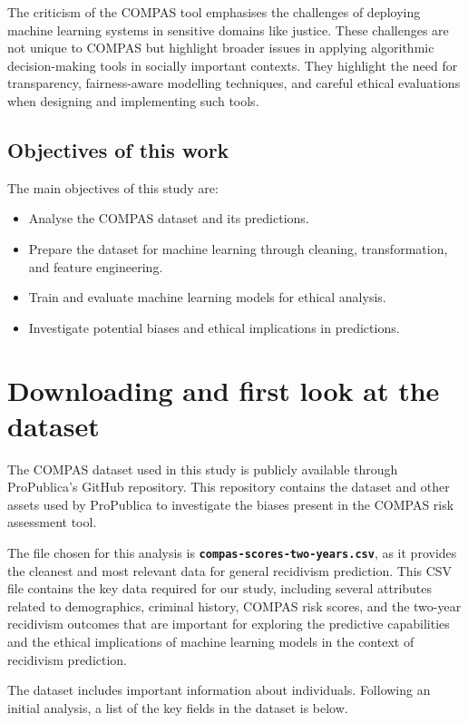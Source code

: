 \documentclass[conference]{IEEEtran}
\begin{document}
	
	The criticism of the COMPAS tool emphasises the challenges of deploying machine learning systems in sensitive domains like justice. These challenges are not unique to COMPAS but highlight broader issues in applying algorithmic decision-making tools in socially important contexts. They highlight the need for transparency, fairness-aware modelling techniques, and careful ethical evaluations when designing and implementing such tools.
	
	\subsection{Objectives of this work}
	
	The main objectives of this study are:  
	
	\begin{itemize}[]
		\item Analyse the COMPAS dataset and its predictions.
		\item Prepare the dataset for machine learning through cleaning, transformation, and feature engineering.
		\item Train and evaluate machine learning models for ethical analysis.
		\item Investigate potential biases and ethical implications in predictions.
	\end{itemize}
	
	
	\section{Downloading and first look at the dataset}
	
	The COMPAS dataset used in this study is publicly available through ProPublica's GitHub repository. This repository contains the dataset and other assets used by ProPublica to investigate the biases present in the COMPAS risk assessment tool.
	
	The file chosen for this analysis is \textbf{\texttt{compas-scores-two-years.csv}}, as it provides the cleanest and most relevant data for general recidivism prediction. This CSV file contains the key data required for our study, including several attributes related to demographics, criminal history, COMPAS risk scores, and the two-year recidivism outcomes that are important for exploring the predictive capabilities and the ethical implications of machine learning models in the context of recidivism prediction. 
		
	The dataset includes important information about individuals. Following an initial analysis, a list of the key fields in the dataset is below.
	
\end{document}
